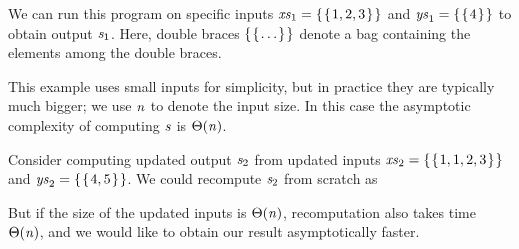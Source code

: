 We can run this program on specific inputs \ensuremath{\Varid{xs}_{1}\mathrel{=}\{\mskip1.5mu \{\mskip1.5mu \mathrm{1},\mathrm{2},\mathrm{3}\mskip1.5mu\}\mskip1.5mu\}}
and \ensuremath{\Varid{ys}_{1}\mathrel{=}\{\mskip1.5mu \{\mskip1.5mu \mathrm{4}\mskip1.5mu\}\mskip1.5mu\}} to obtain output \ensuremath{\Varid{s}_{1}}. Here, double braces
\ensuremath{\{\mskip1.5mu \{\mskip1.5mu \ldots\mskip1.5mu\}\mskip1.5mu\}} denote a bag containing the elements among the double
braces.

\resethooks

This example uses small inputs for simplicity, but in practice they
are typically much bigger; we use \ensuremath{\Varid{n}}
to denote the input size. In this case the asymptotic complexity of computing
\ensuremath{\Varid{s}} is \ensuremath{\Theta(\Varid{n})}.

Consider computing updated output \ensuremath{\Varid{s}_{2}} from updated inputs \ensuremath{\Varid{xs}_{2}\mathrel{=}\{\mskip1.5mu \{\mskip1.5mu \mathrm{1},\mathrm{1},\mathrm{2},\mathrm{3}\mskip1.5mu\}\mskip1.5mu\}}
and \ensuremath{\Varid{ys}_{2}\mathrel{=}\{\mskip1.5mu \{\mskip1.5mu \mathrm{4},\mathrm{5}\mskip1.5mu\}\mskip1.5mu\}}. We could recompute \ensuremath{\Varid{s}_{2}} from scratch as
\resethooks
But if the size of the updated inputs is \ensuremath{\Theta(\Varid{n})}, recomputation also
takes time \ensuremath{\Theta(\Varid{n})}, and we would like to obtain our result asymptotically faster.

